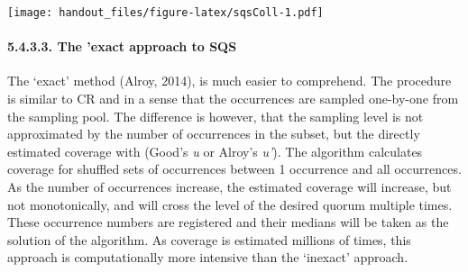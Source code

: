 \documentclass[]{article}
\let\oldparagraph\paragraph
\renewcommand{\paragraph}[1]{\oldparagraph{#1}\mbox{}}
\begin{document}
\texttt{[image: handout\_files/figure-latex/sqsColl-1.pdf]}

\hypertarget{the-exact-approach-to-sqs}{%
\paragraph{5.4.3.3. The 'exact approach to
SQS}\label{the-exact-approach-to-sqs}}

The `exact' method (Alroy, 2014), is much easier to comprehend. The
procedure is similar to CR and in a sense that the occurrences are
sampled one-by-one from the sampling pool. The difference is however,
that the sampling level is not approximated by the number of occurrences
in the subset, but the directly estimated coverage with (Good's \emph{u}
or Alroy's \emph{u'}). The algorithm calculates coverage for shuffled
sets of occurrences between 1 occurrence and all occurrences. As the
number of occurrences increase, the estimated coverage will increase,
but not monotonically, and will cross the level of the desired quorum
multiple times. These occurrence numbers are registered and their
medians will be taken as the solution of the algorithm. As coverage is
estimated millions of times, this approach is computationally more
intensive than the `inexact' approach.
\end{document}
